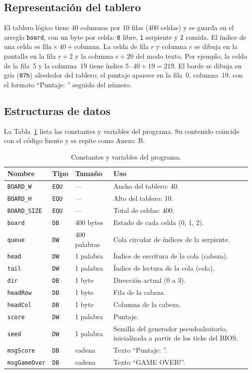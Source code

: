 \documentclass[10pt]{article}
\begin{document}
\subsection{Representación del tablero}
El tablero lógico tiene 40 columnas por 10 filas (400 celdas) y se guarda en el arreglo \texttt{board}, con un byte por celda: \texttt{0} libre, \texttt{1} serpiente y \texttt{2} comida. El índice de una celda es $\text{fila}\times 40+\text{columna}$. La celda de fila $r$ y columna $c$ se dibuja en la pantalla en la fila $r+2$ y la columna $c+20$ del modo texto. Por ejemplo, la celda de la fila~5 y la columna~19 tiene índice $5\cdot 40+19=219$. El borde se dibuja en gris (\texttt{07h}) alrededor del tablero; el puntaje aparece en la fila~0, columna~19, con el formato ``Puntaje: '' seguido del número.

\subsection{Estructuras de datos}
La Tabla~\ref{tab:variables} lista las constantes y variables del programa. Su contenido coincide con el código fuente y se repite como Anexo~B.

\begin{table}[ht]
\centering
\caption{Constantes y variables del programa.}
\label{tab:variables}
\begin{tabular}{@{}p{2.6cm}p{1.4cm}p{2cm}p{7.2cm}@{}}
\toprule
Nombre & Tipo & Tamaño & Uso \\
\midrule
\texttt{BOARD\_W} & \texttt{EQU} & --- & Ancho del tablero: 40. \\
\texttt{BOARD\_H} & \texttt{EQU} & --- & Alto del tablero: 10. \\
\texttt{BOARD\_SIZE} & \texttt{EQU} & --- & Total de celdas: 400. \\
\texttt{board} & \texttt{DB} & 400 bytes & Estado de cada celda (0, 1, 2). \\
\texttt{queue} & \texttt{DW} & 400 palabras & Cola circular de índices de la serpiente. \\
\texttt{head} & \texttt{DW} & 1 palabra & Índice de escritura de la cola (cabeza). \\
\texttt{tail} & \texttt{DW} & 1 palabra & Índice de lectura de la cola (cola). \\
\texttt{dir} & \texttt{DB} & 1 byte & Dirección actual (0 a 3). \\
\texttt{headRow} & \texttt{DB} & 1 byte & Fila de la cabeza. \\
\texttt{headCol} & \texttt{DB} & 1 byte & Columna de la cabeza. \\
\texttt{score} & \texttt{DW} & 1 palabra & Puntaje. \\
\texttt{seed} & \texttt{DW} & 1 palabra & Semilla del generador pseudoaleatorio, inicializada a partir de los ticks del BIOS. \\
\texttt{msgScore} & \texttt{DB} & cadena & Texto ``Puntaje: ''. \\
\texttt{msgGameOver} & \texttt{DB} & cadena & Texto ``GAME OVER!''. \\
\bottomrule
\end{tabular}
\end{table}
\end{document}
